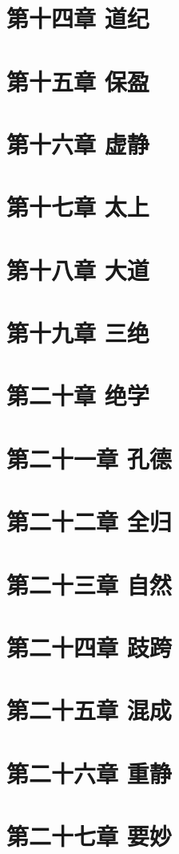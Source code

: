 \documentclass[UTF8]{ctexbook}
\begin{document}
	\section{第十四章 道纪}
	\section{第十五章 保盈}
	\section{第十六章 虚静}
	\section{第十七章 太上}
	\section{第十八章 大道}
	\section{第十九章 三绝}
	\section{第二十章 绝学}
	\section{第二十一章 孔德}
	\section{第二十二章 全归}
	\section{第二十三章 自然}
	\section{第二十四章 跂跨}
	\section{第二十五章 混成}
	\section{第二十六章 重静}
	\section{第二十七章 要妙}
\end{document}
